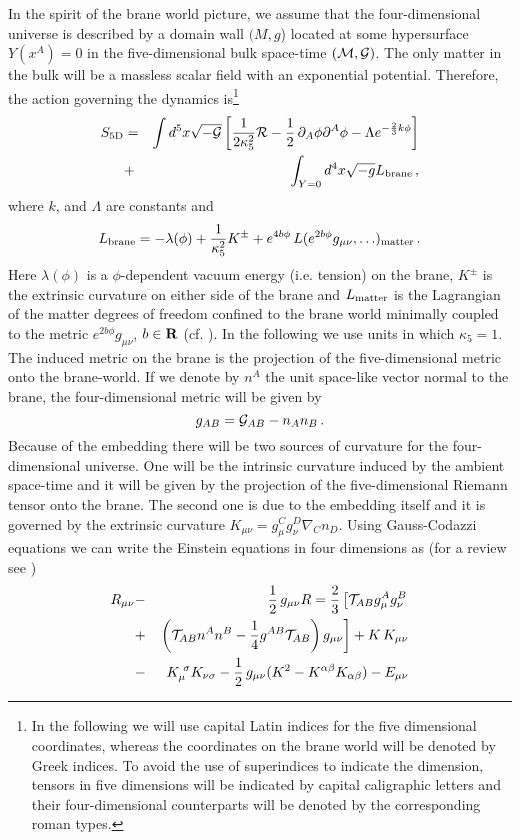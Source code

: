 \documentclass[prd,a4paper,twocolumn,superscriptaddress,nofootinbib,showpacs]{revtex4}
\def\CM{{\cal M}} \def\CP{{\cal P}} \def\CE{{\cal E}}
\def\half{{1\over 2}\,}
\begin{document}
In the spirit of the brane world picture, we  assume that the four-dimensional universe
is described by a domain wall $(M,g$) located at some hypersurface $Y(x^{A})=0$ 
in the five-dimensional bulk space-time $(\CM,\CG)$. The only matter in the bulk
will be a massless scalar field with an exponential potential. Therefore, the action 
governing the dynamics is\footnote{In the following we will
use capital Latin indices for the five dimensional coordinates, whereas the coordinates
on the brane world will be denoted by Greek indices. To avoid the use of superindices to 
indicate the dimension, tensors in five dimensions will be indicated by capital caligraphic
letters and their four-dimensional counterparts will be denoted by the corresponding
roman types.} 
\begin{eqnarray}
S_{\rm 5D} &=& \int d^{5}x\sqrt{-\CG}\left[{1\over 2\kappa_{5}^{2}}
\CR-\half\partial_{A}\phi\partial^{A}\phi
-\Lambda e^{-{2\over 3}k\phi}\right] \nonumber \\
&+&\int_{Y=0} d^{4}x\sqrt{-g}L_{\rm brane} \, ,
\label{act}
\end{eqnarray}
where $k$, and $\Lambda$ are constants and 
$$
L_{\rm brane}=-\lambda(\phi)+{1\over \kappa_{5}^2}K^{\pm}+e^{4b\phi}\,L(e^{2b\phi}g_{\mu\nu},\ldots)_{\rm matter} \, .
$$
Here $\lambda(\phi)$ is a $\phi$-dependent vacuum energy 
(i.e. tension) on the brane, $K^{\pm}$ is the extrinsic curvature on either side of the brane 
and $L_{\rm matter}$ is the Lagrangian of the matter degrees 
of freedom confined to the brane world 
minimally coupled to the metric $e^{2b\phi}g_{\mu\nu}$, $b\in{\bf R}$ (cf. \cite{mw}). 
In the following we  use units in which $\kappa_{5}=1$.
The induced metric on the brane is the projection of the five-dimensional metric onto the
brane-world. If we denote by $n^{A}$ the unit space-like vector normal to the brane, the 
four-dimensional metric will be given by
$$
g_{AB}={\cal G}_{AB}-n_{A}n_{B}\,.
$$
Because of the embedding 
there will be two sources of curvature for the four-dimensional universe. One will be 
the intrinsic curvature induced by the ambient space-time and it will be given by the
projection of the five-dimensional Riemann tensor onto the brane. The second one is due to the 
embedding itself and it is governed by the extrinsic curvature $K_{\mu\nu}=g_{\mu}^{C}g_{\nu}^{D}
\nabla_{C}n_{D}$. Using Gauss-Codazzi equations
\cite{wald} we can write the Einstein equations in four dimensions as \cite{sms,mw,mb} (for
a review see \cite{roy})
\begin{eqnarray}
R_{\mu\nu}&-&\half g_{\mu\nu}R = {2\over 3}\left[\CT_{AB}g_{\mu}^{A}
g_{\nu}^{B} \right.\nonumber \\
&+&\left.\left(\CT_{AB}n^{A}n^{B}-{1\over 4}g^{AB}\CT_{AB}\right)g_{\mu\nu}\right]
+ K\,K_{\mu\nu} \nonumber \\
&-&K^{\,\,\sigma}_{\mu}K_{\nu\sigma}-\half g_{\mu\nu}(K^2-K^{\alpha\beta}K_{\alpha
\beta})-E_{\mu\nu}
\label{ee}
\end{eqnarray}
\end{document}
